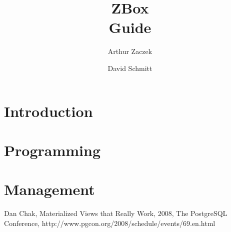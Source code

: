 \documentclass[a4paper,12pt]{report}
\begin{document}
\addtolength{\textheight}{2cm}
\addtolength{\topmargin}{-1cm}


\newcommand{\kw}{\it}
\newcommand{\new}{\bf}
\newcommand{\comment}{\it}

\title{ZBox\\Guide}
\author{Arthur Zaczek}
\author{David Schmitt}

\pagestyle{empty}



\tableofcontents

\setlength{\headheight}{15pt}

\pagestyle{fancy}

\renewcommand{\chaptermark}[1]{\markboth{\chaptername\ \thechapter.\ #1}{}}
\renewcommand{\sectionmark}[1]{\markright{\thesection.\ #1}}

\newenvironment{descriptionBorder}
{
  \begin{framed}
  \begin{description}[labelindent=3mm,leftmargin=*,topsep=0mm]
}
{
  \end{description}
  \end{framed}
}

\chapter{Introduction}

% 

\chapter{Programming}


\chapter{Management}



% 

\begin{thebibliography}{99}





Dan Chak, Materialized Views that Really Work,
2008, The PostgreSQL Conference, http://www.pgcon.org/2008/schedule/events/69.en.html

\end{thebibliography}

\listoffigures


\end{document}
